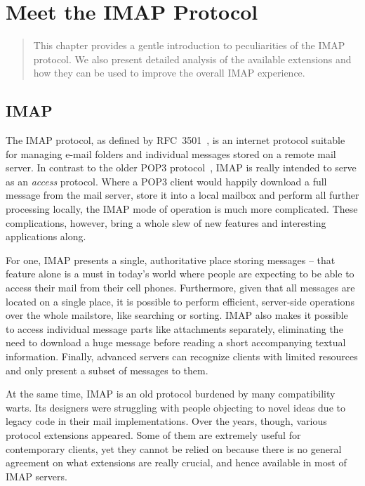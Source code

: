 \documentclass[trojita]{subfiles}
\begin{document}
\chapter{Meet the IMAP Protocol}
\label{sec:imap-protocol}

\begin{abstract}
This chapter provides a gentle introduction to peculiarities of the IMAP protocol.  We also present detailed analysis of
the available extensions and how they can be used to improve the overall IMAP experience.
\end{abstract}

\section{IMAP}

The IMAP protocol, as defined by RFC~3501~\cite{rfc3501}, is an internet protocol suitable for managing e-mail folders
and individual messages stored on a remote mail server.  In contrast to the older POP3 protocol~\cite{rfc1939}, IMAP is
really intended to serve as an {\em access} protocol.  Where a POP3 client would happily download a full message from
the mail server, store it into a local mailbox and perform all further processing locally, the IMAP mode of operation is
much more complicated.  These complications, however, bring a whole slew of new features and interesting applications
along.

For one, IMAP presents a single, authoritative place storing messages -- that feature alone is a must in today's world
where people are expecting to be able to access their mail from their cell phones.  Furthermore, given that all messages
are located on a single place, it is possible to perform efficient, server-side operations over the whole mailstore,
like searching or sorting.  IMAP also makes it possible to access individual message parts like attachments separately,
eliminating the need to download a huge message before reading a short accompanying textual information.  Finally,
advanced servers can recognize clients with limited resources and only present a subset of messages to them.

At the same time, IMAP is an old protocol burdened by many compatibility warts.  Its designers were struggling with
people objecting to novel ideas due to legacy code in their mail implementations.  Over the years, though, various
protocol extensions appeared.  Some of them are extremely useful for contemporary clients, yet they cannot be relied on
because there is no general agreement on what extensions are really crucial, and hence available in most of IMAP
servers.
\end{document}
